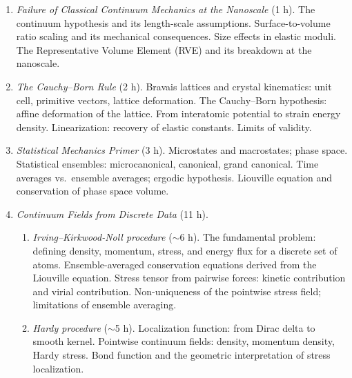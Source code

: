 \documentclass[11pt,a4paper]{scrartcl}
\begin{document}
\begin{enumerate}
	
	\item \textit{Failure of Classical Continuum Mechanics at the Nanoscale} (1 h).
	The continuum hypothesis and its length-scale assumptions. Surface-to-volume ratio
	scaling and its mechanical consequences. Size effects in elastic moduli.
	The Representative Volume Element (RVE) and its breakdown at the nanoscale.
	
	\item \textit{The Cauchy--Born Rule} (2 h).
	Bravais lattices and crystal kinematics: unit cell, primitive vectors, lattice
	deformation. The Cauchy--Born hypothesis: affine deformation of the lattice.
	From interatomic potential to strain energy density. Linearization: recovery of elastic constants. Limits of validity.
	
	\item \textit{Statistical Mechanics Primer} (3 h).
	Microstates and macrostates; phase space. Statistical ensembles: microcanonical,
	canonical, grand canonical. Time averages vs.\ ensemble averages; ergodic hypothesis.
	Liouville equation and conservation of phase space volume.
	
	\item \textit{Continuum Fields from Discrete Data} (11 h).
	
	\begin{enumerate}
		
		\item \textit{Irving--Kirkwood-Noll procedure} ($\sim$6 h).
		The fundamental problem: defining density, momentum, stress, and energy flux
		for a discrete set of atoms. Ensemble-averaged conservation equations derived
		from the Liouville equation. Stress tensor from pairwise forces: kinetic
		contribution and virial contribution.
		Non-uniqueness of the pointwise stress field; limitations of ensemble averaging.
		
		\item \textit{Hardy procedure} ($\sim$5 h).
		Localization function: from Dirac delta to smooth kernel.
		Pointwise continuum fields: density, momentum density,
		Hardy stress. Bond function and the geometric interpretation of stress
		localization. 
		
	\end{enumerate}
	
\end{enumerate}
	
\end{document}
